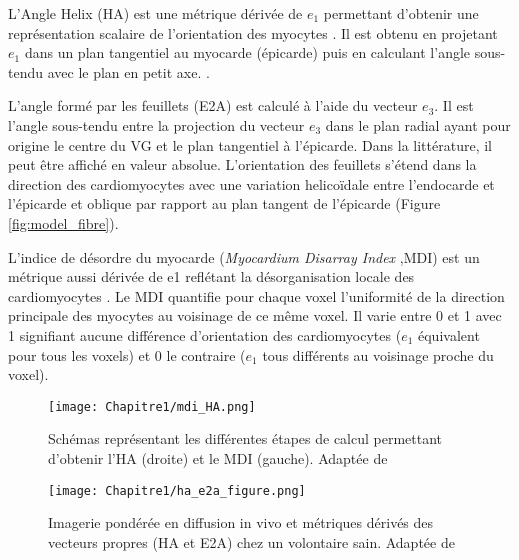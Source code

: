 \begin{bulletList}
\item L’Angle Helix (HA) est une métrique dérivée de $e_1$ permettant d’obtenir une représentation scalaire de l’orientation des myocytes \cite{Ferreira2013}. Il est obtenu en projetant $e_1$ dans un plan tangentiel au myocarde (épicarde) puis en calculant l’angle sous-tendu avec le plan en petit axe. .

\item L’angle formé par les feuillets (E2A) est calculé à l’aide du vecteur $e_3$. Il est l’angle sous-tendu entre la projection du vecteur $e_3$ dans le plan radial ayant pour origine le centre du VG et le plan tangentiel à l’épicarde\cite{Dou2002}. Dans la littérature, il peut être affiché en valeur absolue. L’orientation des feuillets s’étend dans la direction des cardiomyocytes avec une variation helicoïdale entre l’endocarde et l’épicarde et oblique par rapport au plan tangent de l’épicarde (Figure \ref{fig:model_fibre}).

\item L’indice de désordre du myocarde (\textit{Myocardium Disarray Index} ,MDI) est un métrique aussi dérivée de e1 reflétant la désorganisation locale des cardiomyocytes \cite{Wu2004} \cite{GarciaCanadilla2019}. Le MDI quantifie pour chaque voxel l’uniformité de la direction principale des myocytes au voisinage de ce même voxel. Il varie entre 0 et 1 avec 1 signifiant aucune différence d’orientation des cardiomyocytes ($e_1$ équivalent pour tous les voxels) et 0 le contraire ($e_1$ tous différents au voisinage proche du voxel).

\end{bulletList}

\begin{figure}[!h]
\begin{center}
  \texttt{[image: Chapitre1/mdi\_HA.png]}
   \end{center}
  \caption{Schémas représentant les différentes étapes de calcul permettant d’obtenir l’HA (droite) et le MDI (gauche). Adaptée de \cite{Ferreira2013}}
\label{fig:dti_HA_mdi}
\end{figure}



\begin{figure}[!h]
\begin{center}
  \texttt{[image: Chapitre1/ha\_e2a\_figure.png]}
   \end{center}
  \caption{Imagerie pondérée en diffusion in vivo et métriques dérivés des vecteurs propres (HA et E2A) chez un volontaire sain. Adaptée de \cite{Ferreira2014}}
\label{fig:dti_e2A}
\end{figure}




